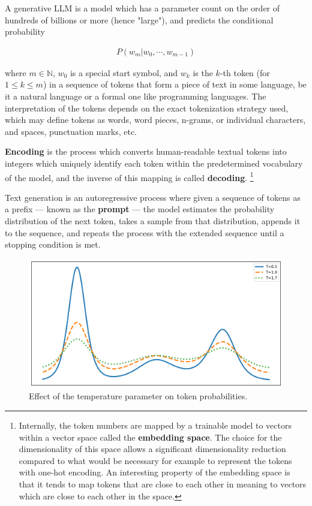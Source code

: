 \documentclass[noindent,nohyp,parspace,titlepage,twoside,12pt]{article}
\begin{document}
      A generative LLM is a model which has a parameter count on the order of
      hundreds of billions or more (hence "large"), and predicts the conditional
      probability \cite{llms}

      \begin{align} \label{eqautoreg}
        P(w_m | w_0, \cdots, w_{m-1})
      \end{align}

      where $m \in \mathbb{N}$, $w_0$ is a special start symbol, and $w_k$ is
      the $k$-th token (for $1 \le k \le m$) in a sequence of tokens that form
      a piece of text in some language, be it a natural language or a formal
      one like programming languages. The interpretation of the tokens depends
      on the exact tokenization strategy used, which may define tokens as
      words, word pieces, n-grams, or individual characters, and spaces,
      punctuation marks, etc.

      \textbf{Encoding} is the process which converts human-readable textual
      tokens into integers which uniquely identify each token within the
      predetermined vocabulary of the model, and the inverse of this mapping
      is called \textbf{decoding}. \footnote{Internally, the token numbers are
      mapped by a trainable model to vectors within a vector space called the
      \textbf{embedding space}. The choice for the dimensionality of this space
      allows a significant dimensionality reduction compared to what would be
      necessary for example to represent the tokens with one-hot encoding. An
      interesting property of the embedding space is that it tends to map
      tokens that are close to each other in meaning to vectors which are close
      to each other in the space.}

      Text generation is an autoregressive process where given a
      sequence of tokens as a prefix --- known as the \textbf{prompt} --- the
      model estimates the probability distribution of the next token, takes a
      sample from that distribution, appends it to the sequence, and repeats
      the process with the extended sequence until a stopping condition is met.

      \begin{figure}[hbtp]
        \label{figtemperature}
        \includegraphics[width=\textwidth]{softmax-temperature}
        \caption{Effect of the temperature parameter on token probabilities.}
      \end{figure}
\end{document}
